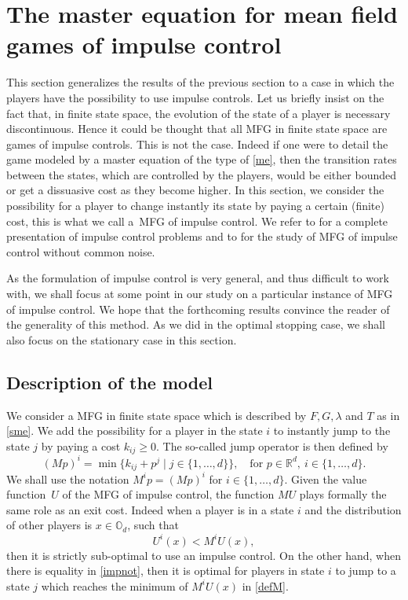 \documentclass[JEP,XML,SOM,Unicode,NoEqCountersInSection,published]{cedram}
\let\sep\mid
\theoremstyle{definition}
\begin{document}
\section{The master equation for mean field games of impulse control}\label{sec:4}
This section generalizes the results of the previous section to a case in which the players have the possibility to use impulse controls. Let us briefly insist on the fact that, in finite state space, the evolution of the state of a player is necessary discontinuous. Hence it could be thought that all MFG in finite state space are games of impulse controls. This is not the case. Indeed if one were to detail the game modeled by a master equation of the type of \eqref{me}, then the transition rates between the states, which are controlled by the players, would be either bounded or get a dissuasive cost as they become higher. In this section, we consider the possibility for a player to change instantly its state by paying a certain (finite) cost, this is what we call a~MFG of impulse control. We refer to \cite{bensoussan1984impulse} for a complete presentation of impulse control problems and to \cite{bertucci2020fokker} for the study of MFG of impulse control without common noise.

As the formulation of impulse control is very general, and thus difficult to work with, we shall focus at some point in our study on a particular instance of MFG of impulse control. We hope that the forthcoming results convince the reader of the generality of this method. As we did in the optimal stopping case, we shall also focus on the stationary case in this section.

\subsection{Description of the model}
We consider a MFG in finite state space which is described by $F,G,\lambda$ and $T$ as in \eqref{sme}. We add the possibility for a player in the state $i$ to instantly jump to the state $j$ by paying a cost $k_{ij}\geq 0$. The so-called jump operator is then defined by
\begin{equation}\label{defM}
(Mp)^i = \min \{ k_{ij}+p^j \sep j \in \{1,\dots,d\}\}, \quad\text{for } p \in \mathbb{R}^d,\ i \in \{1,\dots,d\}.
\end{equation}
We shall use the notation $M^i p = (Mp)^i$ for $i \in \{1,\dots,d\}$. Given the value function~$U$ of the MFG of impulse control, the function $MU$ plays formally the same role as an exit cost. Indeed when a player is in a state $i$ and the distribution of other players is $x \in \mathbb{O}_d$, such that
\begin{equation}\label{impnot}
U^i(x) < M^iU(x),
\end{equation} then it is strictly sub-optimal to use an impulse control. On the other hand, when there is equality in \eqref{impnot}, then it is optimal for players in state $i$ to jump to a state $j$ which reaches the minimum of $M^iU(x)$ in \eqref{defM}.
\end{document}
